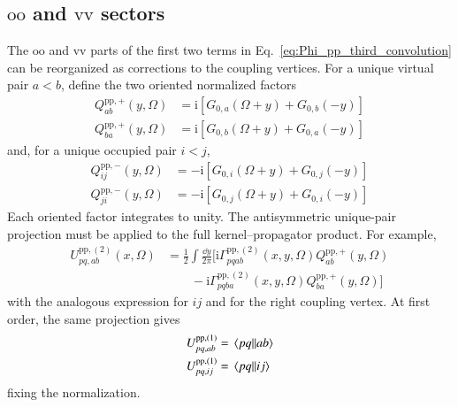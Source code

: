 \documentclass[aip,jcp,reprint,noshowkeys,superscriptaddress]{revtex4-1}
\newcommand{\ii}{\mathrm{i}}
\newcommand{\pp}{\text{pp}}
\begin{document}
\subsection{$\text{oo}$ and $\text{vv}$ sectors}

The $\text{oo}$ and $\text{vv}$ parts of the first two terms in
Eq.~\eqref{eq:Phi_pp_third_convolution} can be reorganized as corrections to
the coupling vertices.
For a unique virtual pair $a<b$, define the two oriented normalized factors
\begin{align}
    Q_{ab}^{\pp,+}(y,\Omega)
    &=
    \ii\left[G_{0,a}(\Omega+y)+G_{0,b}(-y)\right]
    \\
    Q_{ba}^{\pp,+}(y,\Omega)
    &=
    \ii\left[G_{0,b}(\Omega+y)+G_{0,a}(-y)\right]
    \label{eq:Q_pp_plus_orientations}
\end{align}
and, for a unique occupied pair $i<j$,
\begin{align}
    Q_{ij}^{\pp,-}(y,\Omega)
    &=
    -\ii\left[G_{0,i}(\Omega+y)+G_{0,j}(-y)\right]
    \\
    Q_{ji}^{\pp,-}(y,\Omega)
    &=
    -\ii\left[G_{0,j}(\Omega+y)+G_{0,i}(-y)\right]
    \label{eq:Q_pp_minus_orientations}
\end{align}
Each oriented factor integrates to unity.
The antisymmetric unique-pair projection must be applied to the full
kernel--propagator product.  For example,
\begin{equation}
\begin{split}
    U_{pq,ab}^{\pp,(2)}(x,\Omega)
    &=
    \frac12\int\frac{\dd{y}}{2\pi}
    \Big[
    \ii\Gamma_{pqab}^{\pp,(2)}(x,y,\Omega)
    Q_{ab}^{\pp,+}(y,\Omega)
    \\
    &\qquad-
    \ii\Gamma_{pqba}^{\pp,(2)}(x,y,\Omega)
    Q_{ba}^{\pp,+}(y,\Omega)
    \Big]
\end{split}
\label{eq:U_pp_second_projection_ab}
\end{equation}
with the analogous expression for $ij$ and for the right coupling vertex.
At first order, the same projection gives
\begin{align}
	U_{pq,ab}^{\pp,(1)} & = \mel{pq}{}{ab} 
	\\
	U_{pq,ij}^{\pp,(1)} & = \mel{pq}{}{ij}
\end{align}
fixing the normalization.
\end{document}
